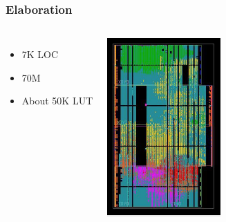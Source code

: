 \documentclass[UTF-8]{ctexbeamer}
\begin{document}
\begin{frame}
  \frametitle{Elaboration}
  \begin{columns}
    \begin{itemize}
      \item 7K LOC
      \item 70M
      \item About 50K LUT
    \end{itemize}
    \begin{center}
      \includegraphics[width=0.5\textwidth]{assets/board.jpg}
    \end{center}
  \end{columns}
\end{frame}
\end{document}

